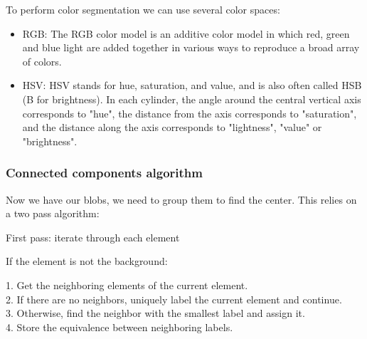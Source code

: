 To perform color segmentation we can use several color spaces:

\begin{itemize}
\item RGB: The RGB color model is an additive color model in which red, green and blue light are added together in various ways to reproduce a broad array of colors. 
\item HSV: HSV stands for hue, saturation, and value, and is also often called HSB (B for brightness). In each cylinder, the angle around the central vertical axis corresponds to "hue", the distance from the axis corresponds to "saturation", and the distance along the axis corresponds to "lightness", "value" or "brightness". 
\end{itemize}

\begin{figure}[H]
\centering
{}
\end{figure}

\subsubsection{Connected components algorithm}

Now we have our blobs, we need to group them to find the center. This relies on a two pass algorithm:

First pass: iterate through each element
 
If the element is not the background:

1.  Get the neighboring elements of the current element.\\
2.  If there are no neighbors, uniquely label the current element and
continue.\\
3.  Otherwise, find the neighbor with the smallest label and assign it.\\
4.  Store the equivalence between neighboring labels.\\

